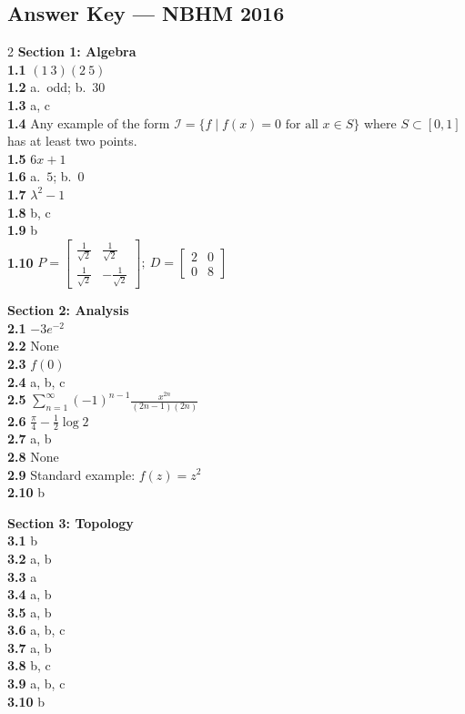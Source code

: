 \documentclass[11pt,a4paper]{article}
\newcommand{\examsec}[1]{%
  \subsection*{#1}
  \vspace{-2pt}
}
\begin{document}
\examsec{Answer Key --- NBHM 2016}
\begin{multicols}{2}
\textbf{Section 1: Algebra}\\
\textbf{1.1} $(1\ 3)(2\ 5)$\\
\textbf{1.2} a.\ odd; b.\ $30$\\
\textbf{1.3} a, c\\
\textbf{1.4} Any example of the form $\mathcal{I} = \{f \mid f(x) = 0 \text{ for all } x \in S\}$ where $S \subset [0, 1]$ has at least two points.\\
\textbf{1.5} $6x + 1$\\
\textbf{1.6} a.\ $5$; b.\ $0$\\
\textbf{1.7} $\lambda^2 - 1$\\
\textbf{1.8} b, c\\
\textbf{1.9} b\\
\textbf{1.10} $P = \begin{bmatrix} \frac{1}{\sqrt{2}} & \frac{1}{\sqrt{2}} \\ \frac{1}{\sqrt{2}} & -\frac{1}{\sqrt{2}} \end{bmatrix};\ D = \begin{bmatrix} 2 & 0 \\ 0 & 8 \end{bmatrix}$

\medskip
\textbf{Section 2: Analysis}\\
\textbf{2.1} $-3e^{-2}$\\
\textbf{2.2} None\\
\textbf{2.3} $f(0)$\\
\textbf{2.4} a, b, c\\
\textbf{2.5} $\sum_{n=1}^{\infty} (-1)^{n-1}\frac{x^{2n}}{(2n-1)(2n)}$\\
\textbf{2.6} $\frac{\pi}{4} - \frac{1}{2}\log 2$\\
\textbf{2.7} a, b\\
\textbf{2.8} None\\
\textbf{2.9} Standard example: $f(z) = z^2$\\
\textbf{2.10} b

\medskip
\textbf{Section 3: Topology}\\
\textbf{3.1} b\\
\textbf{3.2} a, b\\
\textbf{3.3} a\\
\textbf{3.4} a, b\\
\textbf{3.5} a, b\\
\textbf{3.6} a, b, c\\
\textbf{3.7} a, b\\
\textbf{3.8} b, c\\
\textbf{3.9} a, b, c\\
\textbf{3.10} b


\end{multicols}
\end{document}
